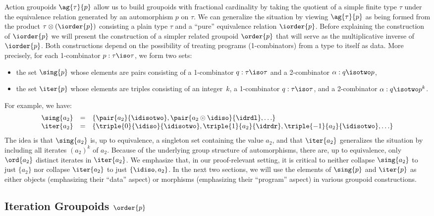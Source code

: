 Action groupoids $\ag{\tau}{p}$ allow us to build groupoids with
fractional cardinality by taking the quotient of a simple finite type
$\tau$ under the equivalence relation generated by an automorphism $p$
on $\tau$. We can generalize the situation by viewing $\ag{\tau}{p}$
as being formed from the product $\tau \otimes (\iorder{p})$
consisting a plain type $\tau$ and a ``pure'' equivalence relation
$\iorder{p}$. Before explaining the construction of $\iorder{p}$ we
will present the construction of a simpler related groupoid
$\order{p}$ that will serve as the multiplicative inverse of
$\iorder{p}$. Both constructions depend on the possibility of treating
programs (1-combinators) from a type to itself as data. More
precisely, for each 1-combinator $p : \tau\iso\tau$, we form two sets:
\begin{itemize}
\item the set $\sing{p}$ whose elements are pairs consisting of a
  1-combinator $q : \tau\iso\tau$ and a 2-combinator
  $\alpha : q \isotwo p$, 
\item the set $\iter{p}$ whose elements are triples consisting of an
  integer~$k$, a 1-combinator $q : \tau\iso\tau$, and a 2-combinator
  $\alpha : q \isotwo p^k$.
\end{itemize} 
For example, we have:
\[\begin{array}{rcl}
\sing{a_2} &=& \{ \pair{a_2}{\idisotwo}, \pair{a_2\odot\idiso}{\idrdl},\ldots \} \\
\iter{a_2} &=& \{ \triple{0}{\idiso}{\idisotwo},\triple{1}{a_2}{\idrdr}, \triple{-1}{a_2}{\idisotwo}, \ldots \}
\end{array}\]
The idea is that $\sing{a_2}$ is, up to equivalence, a singleton set
containing the value $a_2$, and that $\iter{a_2}$ generalizes the
situation by including all iterates $(a_2)^k$ of $a_2$.  Because of
the underlying group structure of automorphisms, there are, up to
equivalence, only $\ord{a_2}$ distinct iterates in $\iter{a_2}$.  We
emphasize that, in our proof-relevant setting, it is critical to
neither collapse $\sing{a_2}$ to just $\{ a_2 \}$ nor collapse
$\iter{a_2}$ to just $\{ \idiso, a_2 \}$. In the next two sections, we
will use the elements of $\sing{p}$ and $\iter{p}$ as either objects
(emphasizing their ``data'' aspect) or morphisms (emphasizing their
``program'' aspect) in various groupoid constructions.

\subsection{Iteration Groupoids $\order{p}$}
   
